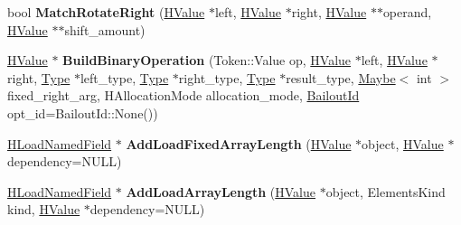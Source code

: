 \begin{DoxyCompactItemize}
\item 
bool {\bfseries Match\+Rotate\+Right} (\hyperlink{classv8_1_1internal_1_1_h_value}{H\+Value} $\ast$left, \hyperlink{classv8_1_1internal_1_1_h_value}{H\+Value} $\ast$right, \hyperlink{classv8_1_1internal_1_1_h_value}{H\+Value} $\ast$$\ast$operand, \hyperlink{classv8_1_1internal_1_1_h_value}{H\+Value} $\ast$$\ast$shift\+\_\+amount)\hypertarget{classv8_1_1internal_1_1_h_graph_builder_ae40e0a8433d23bb5d47bd2136357d590}{}\label{classv8_1_1internal_1_1_h_graph_builder_ae40e0a8433d23bb5d47bd2136357d590}

\item 
\hyperlink{classv8_1_1internal_1_1_h_value}{H\+Value} $\ast$ {\bfseries Build\+Binary\+Operation} (Token\+::\+Value op, \hyperlink{classv8_1_1internal_1_1_h_value}{H\+Value} $\ast$left, \hyperlink{classv8_1_1internal_1_1_h_value}{H\+Value} $\ast$right, \hyperlink{classv8_1_1internal_1_1_type}{Type} $\ast$left\+\_\+type, \hyperlink{classv8_1_1internal_1_1_type}{Type} $\ast$right\+\_\+type, \hyperlink{classv8_1_1internal_1_1_type}{Type} $\ast$result\+\_\+type, \hyperlink{classv8_1_1_maybe}{Maybe}$<$ int $>$ fixed\+\_\+right\+\_\+arg, H\+Allocation\+Mode allocation\+\_\+mode, \hyperlink{classv8_1_1internal_1_1_bailout_id}{Bailout\+Id} opt\+\_\+id=Bailout\+Id\+::\+None())\hypertarget{classv8_1_1internal_1_1_h_graph_builder_a499fb6fcdfefb9c18ffe7e4fbe29e786}{}\label{classv8_1_1internal_1_1_h_graph_builder_a499fb6fcdfefb9c18ffe7e4fbe29e786}

\item 
\hyperlink{classv8_1_1internal_1_1_h_load_named_field}{H\+Load\+Named\+Field} $\ast$ {\bfseries Add\+Load\+Fixed\+Array\+Length} (\hyperlink{classv8_1_1internal_1_1_h_value}{H\+Value} $\ast$object, \hyperlink{classv8_1_1internal_1_1_h_value}{H\+Value} $\ast$dependency=N\+U\+LL)\hypertarget{classv8_1_1internal_1_1_h_graph_builder_a799a2cd15800045e3af54892e60959e3}{}\label{classv8_1_1internal_1_1_h_graph_builder_a799a2cd15800045e3af54892e60959e3}

\item 
\hyperlink{classv8_1_1internal_1_1_h_load_named_field}{H\+Load\+Named\+Field} $\ast$ {\bfseries Add\+Load\+Array\+Length} (\hyperlink{classv8_1_1internal_1_1_h_value}{H\+Value} $\ast$object, Elements\+Kind kind, \hyperlink{classv8_1_1internal_1_1_h_value}{H\+Value} $\ast$dependency=N\+U\+LL)\hypertarget{classv8_1_1internal_1_1_h_graph_builder_a97519307cdc5cfe24ec2446beff6183a}{}\label{classv8_1_1internal_1_1_h_graph_builder_a97519307cdc5cfe24ec2446beff6183a}


\end{DoxyCompactItemize}
